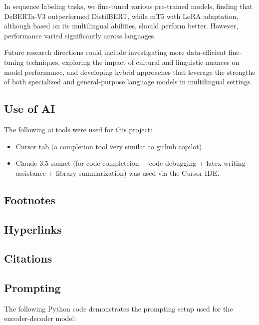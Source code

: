 \documentclass[11pt]{article}
\begin{document}
In sequence labeling tasks, we fine-tuned various pre-trained models, finding that DeBERTa-V3 outperformed DistilBERT, while mT5 with LoRA adaptation, although based on its multilingual abilities, should perform better. 
However, performance varied significantly across languages.

Future research directions could include investigating more data-efficient fine-tuning techniques, exploring the impact of cultural and linguistic nuances on model performance, and developing hybrid approaches that leverage the strengths of both specialized and general-purpose language models in multilingual settings.

\subsection{Use of AI}
The following ai tools were used for this project:

\begin{itemize}
    \item Cursor tab (a completion tool very similat to github copilot)
    \item Claude 3.5 sonnet (for code completeion + code-debugging + latex writing assistance + library summarization) was used via the Cursor IDE.
\end{itemize}

\subsection{Footnotes}

\subsection{Hyperlinks}
\subsection{Citations}


\appendix


\subsection{Prompting}
\label{sec:prompting}
The following Python code demonstrates the prompting setup used for the encoder-decoder model:
\end{document}
